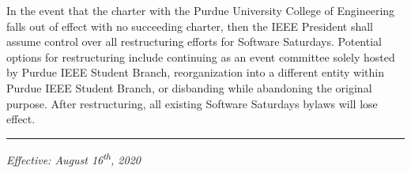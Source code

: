 \documentclass[12pt]{constitution}
\begin{document}
In the event that the charter with the Purdue University College of Engineering falls out of effect with no succeeding charter, then the IEEE President shall assume control over all restructuring efforts for Software Saturdays. Potential options for restructuring include continuing as an event committee solely hosted by Purdue IEEE Student Branch, reorganization into a different entity within Purdue IEEE Student Branch, or disbanding while abandoning the original purpose. After restructuring, all existing Software Saturdays bylaws will lose effect.


\vspace{12pt}
\hrule

\textit{Effective: August 16\textsuperscript{th}, 2020}


\setcounter{tocdepth}{1}
\end{document}
